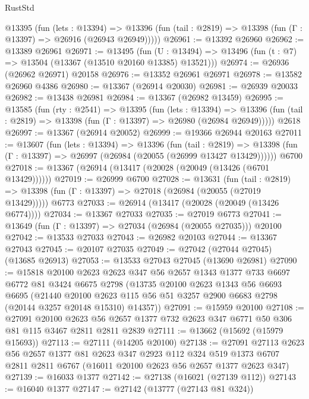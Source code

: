 \begin{lexlean}{RustStd}
\begin{coremodule}
    @13395
      (fun (lets : @13394) =>
      @13396 (fun (tail : @2819) => @13398 (fun (Γ : @13397) => @26916 (@26943 @26949)))))
@26961 := @13392 @26960
@26962 := @13389 @26961
@26971 := @13495
    (fun (U : @13494) => @13496 (fun (t : @7) => @13504 (@13367 (@13510 @20160 @13385) @13521)))
@26974 := @26936 (@26962 @26971) @20158
@26976 := @13352 @26961 @26971
@26978 := @13582 @26960 @4386
@26980 := @13367 (@26914 @20030)
@26981 := @26939 @20033
@26982 := @13438 @26981
@26984 := @13367 (@26982 @13459)
@26995 := @13585
    (fun (rty : @2541) =>
    @13395
      (fun (lets : @13394) =>
      @13396 (fun (tail : @2819) => @13398 (fun (Γ : @13397) => @26980 (@26984 @26949)))))
    @2618
@26997 := @13367 (@26914 @20052)
@26999 := @19366 @26944 @20163
@27011 := @13607
    (fun (lets : @13394) =>
    @13396
      (fun (tail : @2819) =>
      @13398 (fun (Γ : @13397) => @26997 (@26984 (@20055 (@26999 @13427 @13429))))))
    @6700
@27018 := @13367 (@26914 (@13417 (@20028 (@20049 (@13426 (@6701 @13429))))))
@27019 := @26999 @6700
@27028 := @13631
    (fun (tail : @2819) => @13398 (fun (Γ : @13397) => @27018 (@26984 (@20055 (@27019 @13429)))))
    @6773
@27033 := @26914 (@13417 (@20028 (@20049 (@13426 @6774))))
@27034 := @13367 @27033
@27035 := @27019 @6773
@27041 := @13649 (fun (Γ : @13397) => @27034 (@26984 (@20055 @27035))) @20100
@27042 := @13533 @27033
@27043 := @26982 @20103
@27044 := @13367 @27043
@27045 := @20107 @27035
@27049 := @27042 (@27044 @27045) (@13685 @26913)
@27053 := @13533 @27043 @27045 (@13690 @26981)
@27090 := @15818
    @20100
    @2623
    @2623
    @347
    @56
    @2657
    @1343
    @1377
    @733
    @6697
    @6772
    @81
    @3424
    @6675
    @2798
    (@13735
      @20100
      @2623
      @1343
      @56
      @6693
      @6695
      (@21440
        @20100
        @2623
        @115
        @56
        @51
        @3257
        @2900
        @6683
        @2798
        (@20144 @3257 @20148 @15310)
        @14357))
@27091 := @15959 @20100
@27108 := @27091
    @20100
    @2623
    @56
    @2657
    @1377
    @732
    @2623
    @347
    @6771
    @50
    @306
    @81
    @115
    @3467
    @2811
    @2811
    @2839
@27111 := @13662 (@15692 (@15979 @15693))
@27113 := @27111 (@14205 @20100)
@27138 := @27091
    @27113
    @2623
    @56
    @2657
    @1377
    @81
    @2623
    @347
    @2923
    @112
    @324
    @519
    @1373
    @6707
    @2811
    @2811
    @6767
    (@16011 @20100 @2623 @56 @2657 @1377 @2623 @347)
@27139 := @16033 @1377
@27142 := @27138 (@16021 (@27139 @112))
@27143 := @16040 @1377
@27147 := @27142 (@13777 (@27143 @81 @324))

\end{coremodule}
\end{lexlean}
